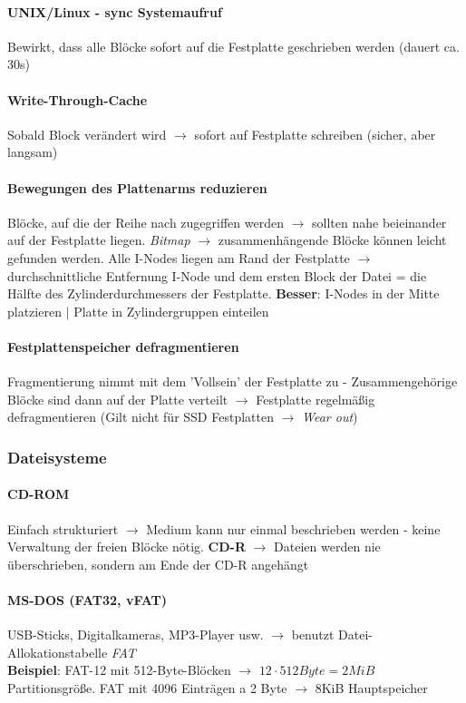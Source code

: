 \documentclass[10pt,a4paper,landscape]{article}
\begin{document}
\begin{multicols*}{3}
	\paragraph{UNIX/Linux - sync Systemaufruf} Bewirkt, dass alle Blöcke sofort auf die Festplatte geschrieben werden (dauert ca. 30s)
	\paragraph{Write-Through-Cache} Sobald Block verändert wird $\rightarrow$ sofort auf Festplatte schreiben (sicher, aber langsam)
	\paragraph{Bewegungen des Plattenarms reduzieren} Blöcke, auf die der Reihe nach zugegriffen werden $\rightarrow$ sollten nahe beieinander auf der Festplatte liegen. \textit{Bitmap} $\rightarrow$ zusammenhängende Blöcke können leicht gefunden werden. Alle I-Nodes liegen am Rand der Festplatte $\rightarrow$ durchschnittliche Entfernung I-Node und dem ersten Block der Datei = die Hälfte des Zylinderdurchmessers der Festplatte. \textbf{Besser}: I-Nodes in der Mitte platzieren $\vert$ Platte in Zylindergruppen einteilen
	\paragraph{Festplattenspeicher defragmentieren} Fragmentierung nimmt mit dem 'Vollsein' der Festplatte zu - Zusammengehörige Blöcke sind dann auf der Platte verteilt $\rightarrow$ Festplatte regelmäßig defragmentieren (Gilt nicht für SSD Festplatten $\rightarrow$ \textit{Wear out})
	\subsubsection{Dateisysteme}
	\paragraph{CD-ROM} Einfach strukturiert $\rightarrow$ Medium kann nur einmal beschrieben werden - keine Verwaltung der freien Blöcke nötig. \textbf{CD-R} $\rightarrow$ Dateien werden nie überschrieben, sondern am Ende der CD-R angehängt
	\paragraph{MS-DOS (FAT32, vFAT)} USB-Sticks, Digitalkameras, MP3-Player usw. $\rightarrow$ benutzt Datei-Allokationstabelle \textit{FAT}\\
	\textbf{Beispiel}: FAT-12 mit 512-Byte-Blöcken $\rightarrow$ $12 \cdot 512 Byte = 2MiB$ Partitionsgröße. FAT mit 4096 Einträgen a 2 Byte $\rightarrow$ 8KiB Hauptspeicher

\end{multicols*}
\end{document}
